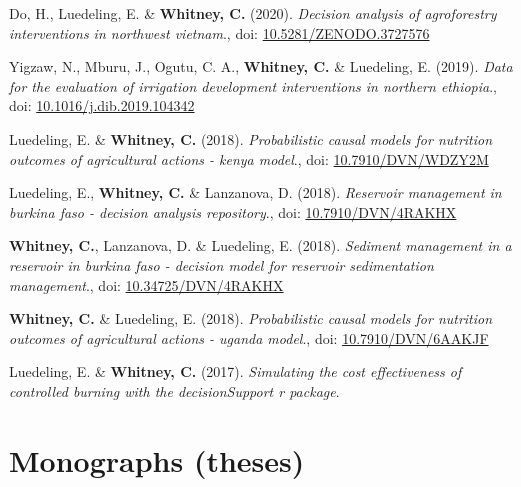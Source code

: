 \documentclass[11pt,a4paper,]{awesome-cv}
\newlength{\cslhangindent}
\newenvironment{CSLReferences}[2] %
 {\begin{list}{}{%
  \setlength{\itemindent}{0pt}
  \setlength{\leftmargin}{0pt}
  \setlength{\parsep}{0pt}
  \ifodd #1
   \setlength{\leftmargin}{\cslhangindent}
   \setlength{\itemindent}{-1\cslhangindent}
  \fi
  \setlength{\itemsep}{#2\baselineskip}}}
 {\end{list}}
\begin{document}
\begin{CSLReferences}{1}{0}
Do, H., Luedeling, E. \& \textbf{Whitney, C.} (2020). \emph{Decision
analysis of agroforestry interventions in northwest vietnam}., doi:
\href{https://doi.org/10.5281/ZENODO.3727576}{10.5281/ZENODO.3727576}

Yigzaw, N., Mburu, J., Ogutu, C. A., \textbf{Whitney, C.} \& Luedeling,
E. (2019). \emph{Data for the evaluation of irrigation development
interventions in northern ethiopia}., doi:
\href{https://doi.org/10.1016/j.dib.2019.104342}{10.1016/j.dib.2019.104342}

Luedeling, E. \& \textbf{Whitney, C.} (2018). \emph{Probabilistic causal
models for nutrition outcomes of agricultural actions - kenya model}.,
doi: \href{https://doi.org/10.7910/DVN/WDZY2M}{10.7910/DVN/WDZY2M}

Luedeling, E., \textbf{Whitney, C.} \& Lanzanova, D. (2018).
\emph{Reservoir management in burkina faso - decision analysis
repository}., doi:
\href{https://doi.org/10.7910/DVN/4RAKHX}{10.7910/DVN/4RAKHX}

\textbf{Whitney, C.}, Lanzanova, D. \& Luedeling, E. (2018).
\emph{Sediment management in a reservoir in burkina faso - decision
model for reservoir sedimentation management}., doi:
\href{https://doi.org/10.34725/DVN/4RAKHX}{10.34725/DVN/4RAKHX}

\textbf{Whitney, C.} \& Luedeling, E. (2018). \emph{Probabilistic causal
models for nutrition outcomes of agricultural actions - uganda model}.,
doi: \href{https://doi.org/10.7910/DVN/6AAKJF}{10.7910/DVN/6AAKJF}

Luedeling, E. \& \textbf{Whitney, C.} (2017). \emph{Simulating the cost
effectiveness of controlled burning with the decisionSupport r package}.

\end{CSLReferences}

\section{Monographs (theses)}\label{monographs-theses}
\end{document}
